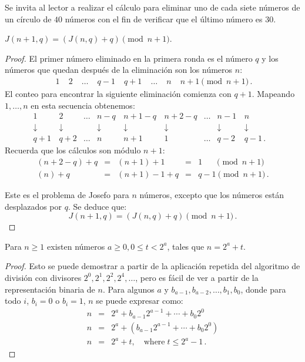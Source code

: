 Se invita al lector a realizar el cálculo para eliminar uno de cada siete números de un círculo de $40$ números con el fin de verificar que el último número es $30$.

\begin{theorem}\label{thm.jo1}
$J(n+1,q)=(J(n,q)+q) \pmod {n+1}$.
\end{theorem}

\begin{proof}
El primer número eliminado en la primera ronda es el número $q$ y los números que quedan después de la eliminación son los números $n$:
\[
\begin{array}{rrrrrrrr}
\;1&\;2&\;\ldots&\;q-1&\;q+1&\;\ldots&\;n&\;n+1 \pmod {n+1}\,.
\end{array}
\]
El conteo para encontrar la siguiente eliminación comienza con $q+1$. Mapeando $1,\ldots,n$ en esta secuencia obtenemos:
\[
\begin{array}{cccccccccc}
1&\, 2&\ldots& n-q&\, n+1-q&\, n+2-q&\ldots&n-1&\, n&\\
\downarrow&\, \downarrow&&\downarrow&\, \downarrow&\, \downarrow&&\downarrow&\, \downarrow\\
q+1&\, q+2&\ldots&n&\, n+1&\, 1&\ldots&q-2&\, q-1\,.
\end{array}
\]
Recuerda que los cálculos son módulo $n+1$:
\[
\begin{array}{lclcl}
(n+2-q)+q&=& (n+1)+1&=& 1 \quad\;\;\pmod {n+1}\\
(n)+q&= &(n+1)-1+q&= &q-1\pmod {n+1}\,.
\end{array}
\]

Este es el problema de Josefo para $n$ números, excepto que los números están desplazados por $q$. Se deduce que:
\[
J(n+1,q)=(J(n,q)+q) \pmod {n+1}\,.
\]
\end{proof}

\begin{theorem}\label{lem.jo}
Para $n\geq 1$ existen números $a\geq 0, 0\leq t < 2^a$, tales que $n=2^a+t$.
\end{theorem}
\begin{proof}
Esto se puede demostrar a partir de la aplicación repetida del algoritmo de división con divisores $2^0, 2^1, 2^2, 2^4,\ldots$, pero es fácil de ver a partir de la representación binaria de $n$. Para algunos $a$ y $b_{a-1},b_{a-2},\ldots,b_{1},b_{0}$, donde para todo $i$, $b_i=0$ o $b_i=1$, $n$ se puede expresar como:
\begin{eqnarray*}
n&=&2^a+b_{a-1}2^{a-1}+\cdots+b_{0}2^{0}\\
n&=&2^a+(b_{a-1}2^{a-1}+\cdots+b_{0}2^{0})\\
n&=&2^a+t,\quad \textrm{where}\; t\leq 2^a-1\,.
\end{eqnarray*}
\end{proof}


